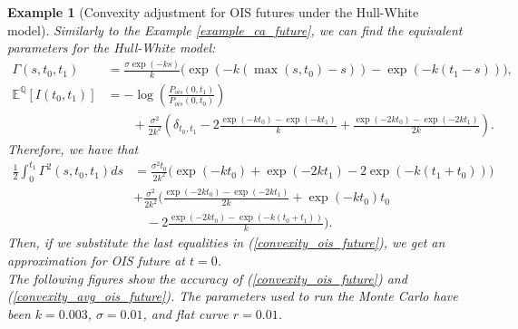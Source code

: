 \documentclass[a4paper,10pt]{article}
\newtheorem{example}[theorem]{Example}
\newcommand{\1}{\mathbf{1}}
\begin{document}
\begin{example}[Convexity adjustment for OIS futures under the Hull-White model]\label{example_convexity_hw_ois}
Similarly to the Example \ref{example_ca_future}, we can find the equivalent parameters for the Hull-White model: 
\begin{align*}
\Gamma(s,t_0,t_1) &= \frac{\sigma \exp(-ks)}{k}\biggl(\exp(-k(\max(s,t_0) - s)) - \exp(-k(t_1-s))\biggr),\\
\mathbb{E}^{\mathbb{Q}}\left[I(t_0,t_1)\right]&=-\log\left(\frac{P_{ois}(0,t_1)}{P_{ois}(0,t_0)}\right)\\
& \text{ }\text{ }\text{ }+ \frac{\sigma^{2}}{2k^{2}}\left(\delta_{t_0,t_1} - 2 \frac{\exp(-kt_0) - \exp(-kt_1)}{k} + \frac{\exp(-2kt_0) - \exp(-2kt_1)}{2k}  \right).
\end{align*}
Therefore, we have that
\begin{align*}
\frac{1}{2}\int_{0}^{t_1} \Gamma^{2}(s,t_0,t_1) ds &= \frac{\sigma^{2}t_0}{2k^{2}} \biggl( \exp(-kt_0) + \exp(-2kt_1) - 2 \exp(-k(t_1+t_0)) \biggr)\\  
&+ \frac{\sigma^{2}}{2k^{2}} \biggl(\frac{\exp(-2kt_0) - \exp(-2kt_1)}{2k}  + \exp(-kt_0)t_0 \\
&\quad - 2 \frac{\exp(-2kt_0) - \exp(-k(t_0 + t_1))}{k}  \biggr).
\end{align*}
Then, if we substitute the last equalities in (\ref{convexity_ois_future}), we get an approximation for OIS future at $t=0$.\\

The following figures show the accuracy of (\ref{convexity_ois_future}) and (\ref{convexity_avg_ois_future}). The parameters used to run the Monte Carlo have been $k=0.003$, $\sigma=0.01$, and flat curve $r=0.01$.


\end{example}
\end{document}
